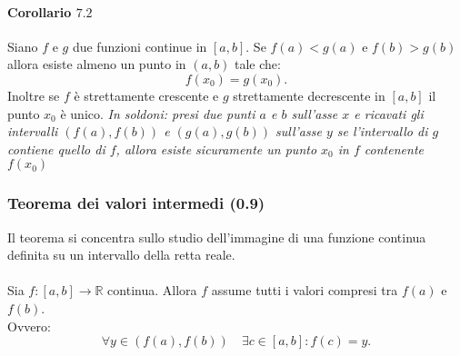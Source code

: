 \documentclass[x11names]{article}
\begin{document}
	\paragraph{Corollario $7.2$}
	Siano $f$ e $g$ due funzioni continue in $\left[a,b\right]$.  Se $f\left(a\right)<g\left(a\right)$ e $f\left(b\right)>g\left(b\right)$ allora esiste almeno un punto in $\left(a,b\right)$ tale che:
	\[
	f\left(x_0\right) = g\left(x_0\right)
	.\] 
	Inoltre se $f$ è strettamente crescente e $g$ strettamente decrescente in $\left[a,b\right]$ il punto $x_0$ è unico. \textit{In soldoni: presi due punti $a$ e $b$ sull'asse $x$ e ricavati gli intervalli $\left(f\left(a\right),f\left(b\right)\right)$ e $\left(g\left(a\right),g\left(b\right)\right)$ sull'asse $y$ se l'intervallo di $g$ contiene quello di $f$, allora esiste sicuramente un punto $x_0$ in $f$ contenente $f\left(x_0\right)$}
	\begin{center}
		
	\end{center}
	
	
	\begin{center}
		\colorbox{myred}{\begin{minipage}{5.75in}
				\begin{redes}{}
					\subsubsection{Teorema dei valori intermedi (0.9)}
					Il teorema si concentra sullo studio dell'immagine di una funzione continua definita su un intervallo  della retta reale.
					\\ \\
					Sia $f:\left[a,b\right] \rightarrow \mathbb{R}$ continua. Allora $f$ assume tutti i valori compresi tra $f\left(a\right)$ e $f\left(b\right)$.
					\\
					Ovvero:
					\[
					\forall y \in \left(f\left(a\right),f\left(b\right)\right) \quad \exists c \in \left[a,b\right] : f\left(c\right) = y
					.\] 
				\end{redes}
		\end{minipage}}        
	\end{center}
	\begin{center}
		
	\end{center}
	
\end{document}
